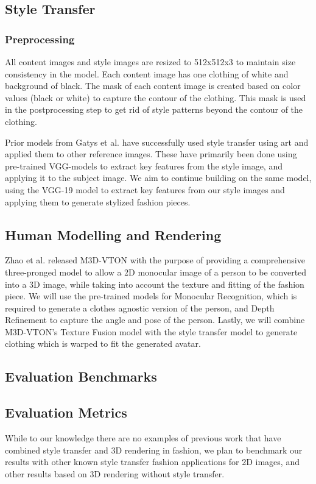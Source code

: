 \documentclass{article}
\begin{document}
\subsection{Style Transfer} 
\subsubsection{Preprocessing}
All content images and style images are resized to 512x512x3 to maintain size consistency in the model. Each content image has one clothing of white and background of black. The mask of each content image is created based on color values (black or white) to capture the contour of the clothing. This mask is used in the postprocessing step to get rid of style patterns beyond the contour of the clothing. 



Prior models from Gatys et al.\cite{gatys2016styleTransfer} have successfully used style transfer using art and applied them to other reference images. These have primarily been done using pre-trained VGG-models to extract key features from the style image, and applying it to the subject image. We aim to continue building on the same model, using the VGG-19 model to extract key features from our style images and applying them to generate stylized fashion pieces. 

\subsection{Human Modelling and Rendering} Zhao et al. released M3D-VTON\cite{m3dvton} with the purpose of providing a comprehensive three-pronged model to allow a 2D monocular image of a person to be converted into a 3D image, while taking into account the texture and fitting of the fashion piece. We will use the pre-trained models for Monocular Recognition, which is required to generate a clothes agnostic version of the person, and Depth Refinement to capture the angle and pose of the person. Lastly, we will combine M3D-VTON's Texture Fusion model with the style transfer model to generate clothing which is warped to fit the generated avatar. 

\subsection{Evaluation Benchmarks}

\subsection{Evaluation Metrics}
While to our knowledge there are no examples of previous work that have combined style transfer and 3D rendering in fashion, we plan to benchmark our results with other known style transfer fashion applications for 2D images\cite{date2017fashion2d}\cite{wang2020fashionSegmentation}, and other results based on 3D rendering without style transfer. 
\end{document}
